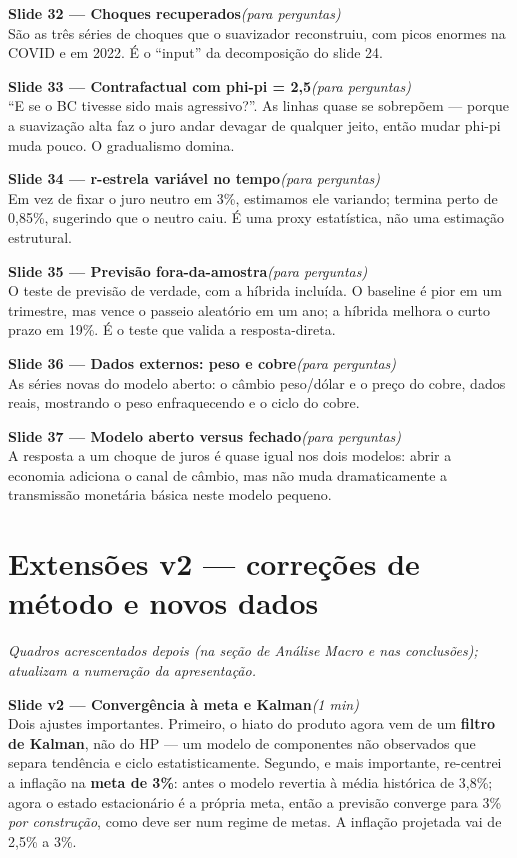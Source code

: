 \documentclass[11pt,a4paper]{article}
\newcommand{\slide}[3]{\medskip\noindent{\color{azul}\rule{3pt}{14pt}}\;
  \textbf{Slide #1 --- #2}\hfill\textit{(#3)}\\[1mm]}
\begin{document}
\slide{32}{Choques recuperados}{para perguntas}
São as três séries de choques que o suavizador reconstruiu, com picos enormes na COVID e em 2022. É o
``input'' da decomposição do slide 24.

\slide{33}{Contrafactual com phi-pi = 2,5}{para perguntas}
``E se o BC tivesse sido mais agressivo?''. As linhas quase se sobrepõem --- porque a suavização alta
faz o juro andar devagar de qualquer jeito, então mudar phi-pi muda pouco. O gradualismo domina.

\slide{34}{r-estrela variável no tempo}{para perguntas}
Em vez de fixar o juro neutro em 3\%, estimamos ele variando; termina perto de 0,85\%, sugerindo que o
neutro caiu. É uma proxy estatística, não uma estimação estrutural.

\slide{35}{Previsão fora-da-amostra}{para perguntas}
O teste de previsão de verdade, com a híbrida incluída. O baseline é pior em um trimestre, mas vence o
passeio aleatório em um ano; a híbrida melhora o curto prazo em 19\%. É o teste que valida a
resposta-direta.

\slide{36}{Dados externos: peso e cobre}{para perguntas}
As séries novas do modelo aberto: o câmbio peso/dólar e o preço do cobre, dados reais, mostrando o peso
enfraquecendo e o ciclo do cobre.

\slide{37}{Modelo aberto versus fechado}{para perguntas}
A resposta a um choque de juros é quase igual nos dois modelos: abrir a economia adiciona o canal de
câmbio, mas não muda dramaticamente a transmissão monetária básica neste modelo pequeno.

\section{Extensões v2 --- correções de método e novos dados}
\textit{Quadros acrescentados depois (na seção de Análise Macro e nas conclusões); atualizam a
numeração da apresentação.}

\slide{v2}{Convergência à meta e Kalman}{1 min}
Dois ajustes importantes. Primeiro, o hiato do produto agora vem de um \textbf{filtro de Kalman}, não
do HP --- um modelo de componentes não observados que separa tendência e ciclo estatisticamente.
Segundo, e mais importante, re-centrei a inflação na \textbf{meta de 3\%}: antes o modelo revertia à
média histórica de 3,8\%; agora o estado estacionário é a própria meta, então a previsão converge para
3\% \emph{por construção}, como deve ser num regime de metas. A inflação projetada vai de 2,5\% a 3\%.
\end{document}
